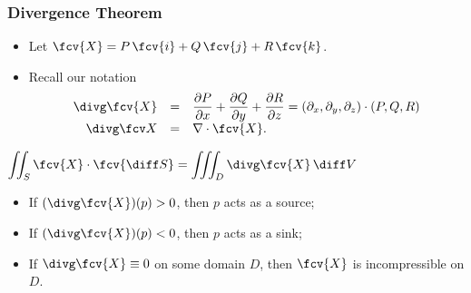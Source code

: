 \begin{frame}
\frametitle{Divergence Theorem}
\begin{itemize}
\item Let  $\fcv{X} = P\, \fcv{i} + Q\, \fcv{j} +R\, \fcv{k}$.
\item Recall our notation
\[
\begin{array}{rcl}
\displaystyle \divg \fcv{X} &=&\displaystyle \frac{\partial P}{\partial x}+ \frac{\partial Q}{\partial y} + \frac{\partial R}{\partial z}  = \left( \partial_x, \partial_y, \partial_z \right) \cdot \left( P, Q, R\right) \\
\displaystyle \divg \fcv X&=&\displaystyle \nabla \cdot \fcv{X} .
\end{array}
\]

\end{itemize}

\begin{theorem}
$\displaystyle\iint_S \fcv{X} \cdot \fcv{\diff S} = \iiint_D \divg \fcv{X} \, \diff V$
\end{theorem}

\begin{itemize}
\item If $(\divg \fcv{X})(p)>0$, then $p$ acts as a source;
\item If $(\divg \fcv{X})(p)<0$, then $p$ acts as a sink;
\item If $\divg \fcv{X} \equiv 0$ on some domain $D$, then $\fcv{X}$ is incompressible on $D$.
\end{itemize}

\end{frame}
